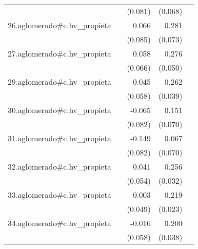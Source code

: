 {\begin{longtable}{l*{4}{D{.}{.}{-1}}}
            &                     &     (0.081)         &     (0.068)         &                     \\
\addlinespace
26.aglomerado#c.hv\_propieta&                     &       0.066         &       0.281\sym{***}&                     \\
            &                     &     (0.085)         &     (0.073)         &                     \\
\addlinespace
27.aglomerado#c.hv\_propieta&                     &       0.058         &       0.276\sym{***}&                     \\
            &                     &     (0.066)         &     (0.050)         &                     \\
\addlinespace
29.aglomerado#c.hv\_propieta&                     &       0.045         &       0.262\sym{***}&                     \\
            &                     &     (0.058)         &     (0.039)         &                     \\
\addlinespace
30.aglomerado#c.hv\_propieta&                     &      -0.065         &       0.151\sym{*}  &                     \\
            &                     &     (0.082)         &     (0.070)         &                     \\
\addlinespace
31.aglomerado#c.hv\_propieta&                     &      -0.149         &       0.067         &                     \\
            &                     &     (0.082)         &     (0.070)         &                     \\
\addlinespace
32.aglomerado#c.hv\_propieta&                     &       0.041         &       0.256\sym{***}&                     \\
            &                     &     (0.054)         &     (0.032)         &                     \\
\addlinespace
33.aglomerado#c.hv\_propieta&                     &       0.003         &       0.219\sym{***}&                     \\
            &                     &     (0.049)         &     (0.023)         &                     \\
\addlinespace
34.aglomerado#c.hv\_propieta&                     &      -0.016         &       0.200\sym{***}&                     \\
            &                     &     (0.058)         &     (0.038)         &                     \\

\end{longtable}}
